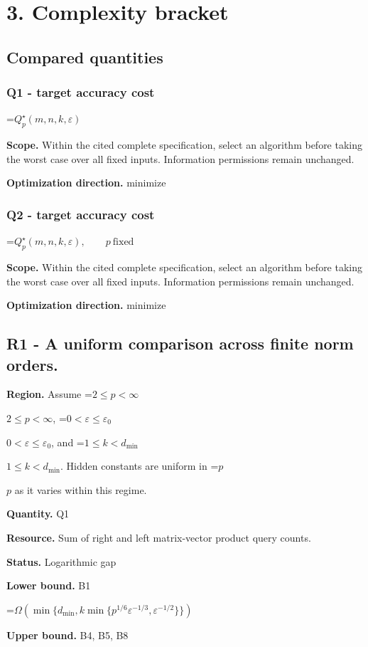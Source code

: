 \documentclass[10pt,a4paper]{article}
\newcommand{\AtlasMath}[1]{\par\begingroup\centering\setbox0=\hbox{$\displaystyle #1$}\ifdim\wd0>1.4\linewidth\typeout{ATLAS WIDE FORMULA: \the\wd0}\fi\ifdim\wd0>\linewidth\resizebox{\linewidth}{!}{\box0}\else\box0\fi\par\endgroup}
\newcommand{\AtlasInlineMath}[1]{\begingroup\setbox0=\hbox{$#1$}\ifdim\wd0>.4\linewidth\endgroup\AtlasMath{#1}\else\endgroup$#1$\fi}
\begin{document}
\section{3. Complexity bracket}
\subsection{Compared quantities}
\subsubsection{Q1 - target accuracy cost}
\AtlasMath{Q_p^\star(m,n,k,\varepsilon)}
\textbf{Scope.} Within the cited complete specification, select an algorithm before taking the worst case over all fixed inputs. Information permissions remain unchanged.

\textbf{Optimization direction.} minimize

\subsubsection{Q2 - target accuracy cost}
\AtlasMath{Q_p^\star(m,n,k,\varepsilon),\qquad p\ \mathrm{fixed}}
\textbf{Scope.} Within the cited complete specification, select an algorithm before taking the worst case over all fixed inputs. Information permissions remain unchanged.

\textbf{Optimization direction.} minimize

\subsection{R1 - A uniform comparison across finite norm orders.}
\textbf{Region.} Assume \AtlasInlineMath{2\le p<\infty}, \AtlasInlineMath{0<\varepsilon\le\varepsilon_0}, and \AtlasInlineMath{1\le k<d_{\mathrm{min}}}. Hidden constants are uniform in \AtlasInlineMath{p} as it varies within this regime.

\textbf{Quantity.} Q1

\textbf{Resource.} Sum of right and left matrix-vector product query counts.

\textbf{Status.} Logarithmic gap

\textbf{Lower bound.} B1

\AtlasMath{\Omega(\min\{d_{\mathrm{min}},k\min\{p^{1/6}\varepsilon^{-1/3},\varepsilon^{-1/2}\}\})}
\textbf{Upper bound.} B4, B5, B8
\end{document}

